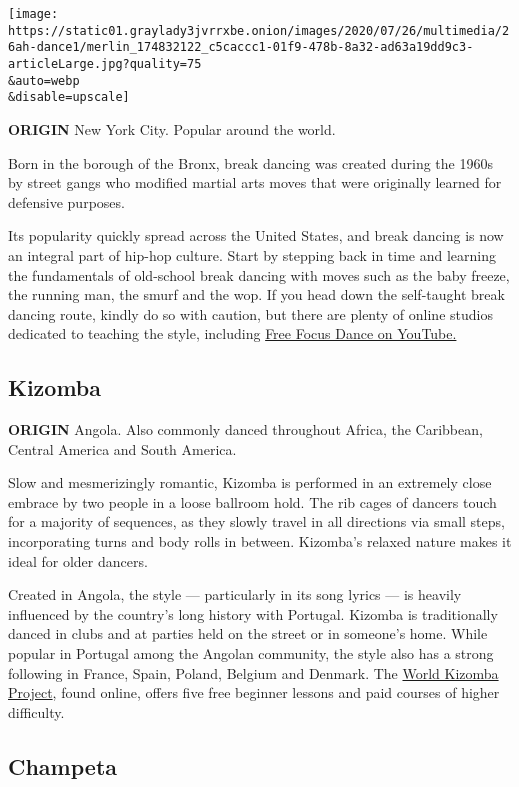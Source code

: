 \texttt{[image: https://static01.graylady3jvrrxbe.onion/images/2020/07/26/multimedia/26ah-dance1/merlin\_174832122\_c5caccc1-01f9-478b-8a32-ad63a19dd9c3-articleLarge.jpg?quality=75\\\&auto=webp\\\&disable=upscale]}

\textbf{ORIGIN} New York City. Popular around the world.

Born in the borough of the Bronx, break dancing was created during the
1960s by street gangs who modified martial arts moves that were
originally learned for defensive purposes.

Its popularity quickly spread across the United States, and break
dancing is now an integral part of hip-hop culture. Start by stepping
back in time and learning the fundamentals of old-school break dancing
with moves such as the baby freeze, the running man, the smurf and the
wop. If you head down the self-taught break dancing route, kindly do so
with caution, but there are plenty of online studios dedicated to
teaching the style, including
\href{https://www.youtube.com/channel/UCo7SFDRvz0R7XDzM9pN1JCg}{Free
Focus Dance on YouTube.}

\hypertarget{kizomba}{%
\subsection{Kizomba}\label{kizomba}}

\textbf{ORIGIN} Angola. Also commonly danced throughout Africa, the
Caribbean, Central America and South America.

Slow and mesmerizingly romantic, Kizomba is performed in an extremely
close embrace by two people in a loose ballroom hold. The rib cages of
dancers touch for a majority of sequences, as they slowly travel in all
directions via small steps, incorporating turns and body rolls in
between. Kizomba's relaxed nature makes it ideal for older dancers.

Created in Angola, the style --- particularly in its song lyrics --- is
heavily influenced by the country's long history with Portugal. Kizomba
is traditionally danced in clubs and at parties held on the street or in
someone's home. While popular in Portugal among the Angolan community,
the style also has a strong following in France, Spain, Poland, Belgium
and Denmark. The \href{https://www.worldkizombaproject.com/}{World
Kizomba Project}, found online, offers five free beginner lessons and
paid courses of higher difficulty.

\hypertarget{champeta}{%
\subsection{Champeta}\label{champeta}}

